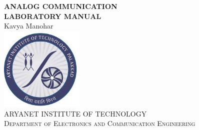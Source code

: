 \begin{titlepage}
\begin{center}
\Large{{\textbf{ANALOG COMMUNICATION\\ LABORATORY MANUAL}}}\\[2cm]
{Kavya Manohar}\\[2cm]
\includegraphics[height=4cm,width=4cm]{AITlogo.jpg}\\[3cm]
\textsc{\Large {ARYANET INSTITUTE OF TECHNOLOGY}}~\\[.5cm]
{\textsc{\Large {Department of Electronics and Communication Engineering}}}\\
\end{center}
\end{titlepage}
